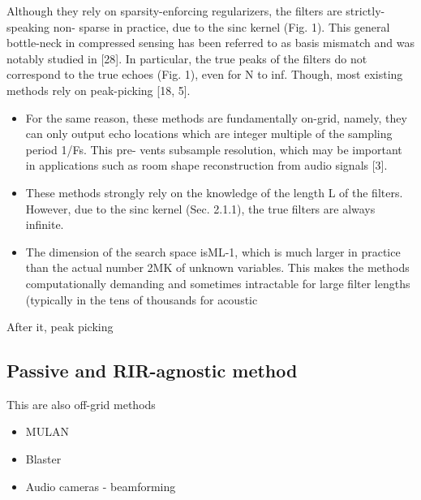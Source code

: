 Although they rely on sparsity-enforcing regularizers, the filters are strictly-speaking non- sparse in practice, due to the sinc kernel (Fig. 1). This general bottle-neck in compressed sensing has been referred to as basis mismatch and was notably studied in [28]. In particular, the true peaks of the filters do not correspond to the true echoes (Fig. 1), even for N to inf. Though, most existing methods rely on peak-picking [18, 5].
\begin{itemize}
    \item For the same reason, these methods are fundamentally on-grid, namely, they can only output echo locations which are integer multiple of the sampling period 1/Fs. This pre- vents subsample resolution, which may be important in applications such as room shape reconstruction from audio signals [3].
    \item These methods strongly rely on the knowledge of the length L of the filters. However, due to the sinc kernel (Sec. 2.1.1), the true filters are always infinite.
    \item The dimension of the search space isML-1, which is much larger in practice than the actual number 2MK of unknown variables. This makes the methods computationally demanding and sometimes intractable for large filter lengths (typically in the tens of thousands for acoustic
\end{itemize}

After it, peak picking

\subsection{Passive and RIR-agnostic method}
This are also off-grid methods
\begin{itemize}
    \item MULAN 
    \item Blaster 
    \item Audio cameras - beamforming~
\end{itemize}



